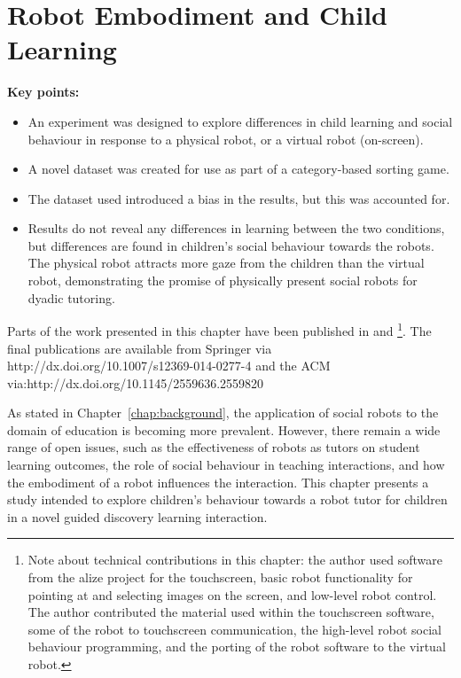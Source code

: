 \chapter{Robot Embodiment and Child Learning} \label{chap:embodiment}

\begin{framed}
	\textbf{Key points:}
	
	\begin{itemize}
	\item An experiment was designed to explore differences in child \gls{learning} and social behaviour in response to a physical robot, or a virtual robot (on-screen).
	\item A novel dataset was created for use as part of a category-based sorting game.
	\item The dataset used introduced a bias in the results, but this was accounted for.
	\item Results do not reveal any differences in \gls{learning} between the two conditions, but differences are found in children's social behaviour towards the robots. The physical robot attracts more gaze from the children than the virtual robot, demonstrating the promise of physically present social robots for dyadic tutoring.
	\end{itemize}
\end{framed}

Parts of the work presented in this chapter have been published in \cite{kennedy2014children} and \cite{kennedy2015comparing}\footnote{Note about technical contributions in this chapter: the author used software from the \acrshort{alize} project for the touchscreen, basic robot functionality for pointing at and selecting images on the screen, and low-level robot control. The author contributed the material used within the touchscreen software, some of the robot to touchscreen communication, the high-level robot social behaviour programming, and the porting of the robot software to the virtual robot.}. The final publications are available from Springer via http://dx.doi.org/10.1007/s12369-014-0277-4 and the ACM via:\newline http://dx.doi.org/10.1145/2559636.2559820

\newpage
As stated in Chapter~\ref{chap:background}, the application of social robots to the domain of education is becoming more prevalent. However, there remain a wide range of open issues, such as the effectiveness of robots as tutors on student learning outcomes, the role of social behaviour in teaching interactions, and how the embodiment of a robot influences the interaction. This chapter presents a study intended to explore children's behaviour towards a robot tutor for children in a novel guided discovery learning interaction. 

